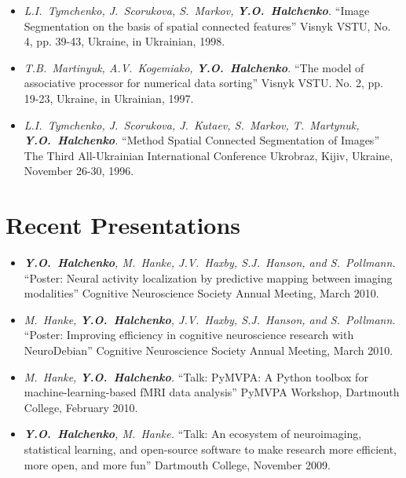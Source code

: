 \documentclass[12pt,overlapped,line]{res}
\newcommand{\mtitle}[1]{``#1''}
\newcommand{\mauthors}[1]{ \textit{#1.}}
\newcommand{\mwhere}[1]{#1.}
\begin{document}
\begin{resume}
\begin{itemize}
   \item
     \mauthors{L.I.~Tymchenko, J.~Scorukova, S.~Markov, \textbf{Y.O.~Halchenko}}
     \mtitle{Image Segmentation on the basis of spatial connected features}
     \mwhere{Visnyk VSTU, No. 4, pp. 39-43, Ukraine, in Ukrainian, 1998}

   \item
     \mauthors{T.B.~Martinyuk, A.V.~Kogemiako, \textbf{Y.O.~Halchenko}}
     \mtitle{The model of associative processor for numerical data sorting}
     \mwhere{ Visnyk VSTU. No. 2, pp. 19-23, Ukraine, in Ukrainian, 1997}

   \item
     \mauthors{L.I.~Tymchenko, J.~Scorukova, J.~Kutaev, S.~Markov, T.~Martynuk, \textbf{Y.O.~Halchenko}}
     \mtitle{Method Spatial Connected Segmentation of Images}
     \mwhere{The Third All-Ukrainian International Conference Ukrobraz, Kijiv, Ukraine, November 26-30, 1996}
 \end{itemize}

\section{Recent Presentations}

 \begin{itemize}

 \item
   \mauthors{\textbf{Y.O.~Halchenko}, M.~Hanke, J.V.~Haxby, S.J.~Hanson, and S.~Pollmann}
   \mtitle{Poster: Neural activity localization by predictive mapping between imaging modalities}
   \mwhere{Cognitive Neuroscience Society Annual Meeting, March 2010}

 \item
   \mauthors{M.~Hanke, \textbf{Y.O.~Halchenko}, J.V.~Haxby, S.J.~Hanson, and S.~Pollmann}
   \mtitle{Poster: Improving efficiency in cognitive neuroscience research with NeuroDebian}
   \mwhere{Cognitive Neuroscience Society Annual Meeting, March 2010}

 \item
   \mauthors{M.~Hanke, \textbf{Y.O.~Halchenko}}
   \mtitle{Talk: PyMVPA: A Python toolbox for machine-learning-based fMRI data analysis}
   \mwhere{PyMVPA Workshop, Dartmouth College, February 2010}

 \item
   \mauthors{\textbf{Y.O.~Halchenko}, M.~Hanke}
   \mtitle{Talk: An ecosystem of neuroimaging, statistical learning,
     and open-source software to make research more efficient, more open,
     and more fun}
   \mwhere{Dartmouth College, November 2009}


\end{itemize}
\end{resume}
\end{document}
